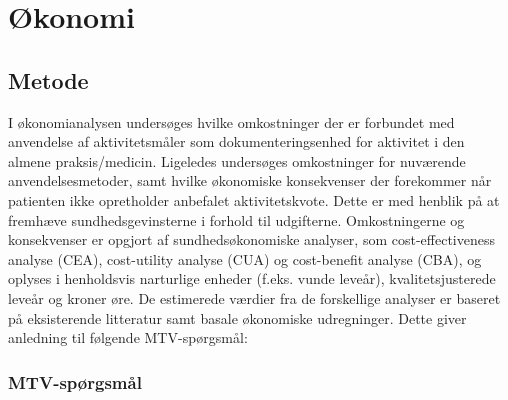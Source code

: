 \chapter{Økonomi}

\section{Metode}

I økonomianalysen undersøges hvilke omkostninger der er forbundet med anvendelse af aktivitetsmåler som dokumenteringsenhed for aktivitet i den almene praksis/medicin.
Ligeledes undersøges omkostninger for nuværende anvendelsesmetoder, samt hvilke økonomiske konsekvenser der forekommer når patienten ikke opretholder anbefalet aktivitetskvote.
Dette er med henblik på at fremhæve sundhedsgevinsterne i forhold til udgifterne.   
Omkostningerne og konsekvenser er opgjort af sundhedsøkonomiske analyser, som cost-effectiveness analyse (CEA), cost-utility analyse (CUA) og cost-benefit analyse (CBA), og oplyses i henholdsvis narturlige enheder (f.eks. vunde leveår), kvalitetsjusterede leveår og kroner øre. 
De estimerede værdier fra de forskellige analyser er baseret på eksisterende litteratur samt basale økonomiske udregninger.
Dette giver anledning til følgende MTV-spørgsmål: 

\subsection{MTV-spørgsmål}

